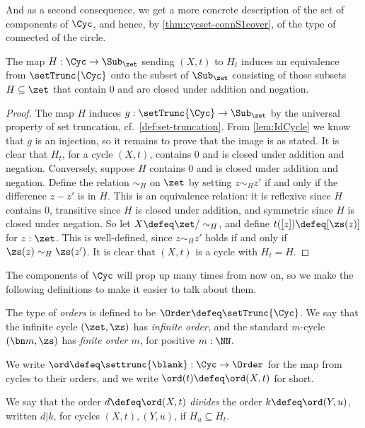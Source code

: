 And as a second consequence,
we get a more concrete description of the set of components of $\Cyc$,
and hence, by \cref{thm:cycset-connS1cover},
of the type of connected \coverings of the circle.
\begin{corollary}\label{cor:set-trunc-cyc}
  The map $H : \Cyc \to \Sub_\zet$ sending $(X,t)$ to $H_t$
  induces an equivalence from $\setTrunc{\Cyc}$
  onto the subset of $\Sub_\zet$ consisting of those subsets
  $H \subseteq \zet$ that contain $0$ and are closed under addition and negation.
\end{corollary}
\begin{proof}
  The map $H$ induces $g : \setTrunc{\Cyc} \to \Sub_\zet$
  by the universal property of set truncation, cf.~\cref{def:set-truncation}.
  From \cref{lem:IdCycle} we know that $g$ is an injection,
  so it remains to prove that the image is as stated.
  It is clear that $H_t$, for a cycle $(X,t)$, contains $0$ and is closed
  under addition and negation.
  Conversely, suppose $H$ contains $0$ and is closed under addition and negation.
  Define the relation $\sim_H$ on $\zet$ by setting $z \sim_H z'$ if and only if
  the difference $z-z'$ is in $H$.
  This is an equivalence relation:
  it is reflexive since $H$ contains $0$,
  transitive since $H$ is closed under addition,
  and symmetric since $H$ is closed under negation.
  So let $X \defeq \zet/\sim_H$, and define $t([z])\defeq[\zs(z)]$
  for $z:\zet$.
  This is well-defined, since $z \sim_H z'$ holds if and only if
  $\zs(z) \sim_H \zs(z')$.
  It is clear that $(X,t)$ is a cycle with $H_t = H$.
\end{proof}
The components of $\Cyc$ will prop up many times from now on,
so we make the following definitions to make it easier to talk about them.
\begin{definition}\label{def:Order}
  The type of \emph{orders} is defined to be
  $\Order\defeq\setTrunc{\Cyc}$.
  We say that the infinite cycle $(\zet,\zs)$ has \emph{infinite order},
  and the standard $m$-cycle $(\bn m,\zs)$ has \emph{finite order $m$},
  for positive $m:\NN$.

  We write $\ord\defeq\settrunc{\blank}:\Cyc\to\Order$ for the map
  from cycles to their orders, and we write $\ord(t)\defeq\ord(X,t)$ for short.

  We say that the order $d\defeq\ord(X,t)$ \emph{divides} the order $k\defeq\ord(Y,u)$, written $d | k$,
  for cycles $(X,t),(Y,u)$, if $H_u \subseteq H_t$.
\end{definition}
